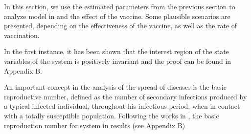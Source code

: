 \label{Sec:Rv_Analysis}
    In this section, we use the estimated parameters from the
previous section to analyze model in  and the effect of the
vaccine. Some plausible scenarios are presented, depending on the effectiveness
of the vaccine, as well as the rate of vaccination.

    In the first instance, it has been shown that the interest region
of the state variables of the system is positively invariant and the proof can
be found in Appendix B.

    An important concept in the analysis of the spread of diseases is
the basic reproductive number, defined as the number of secondary
infections produced by a typical infected individual, throughout his
infectious period, when in contact with a totally susceptible population.
Following the works in \cite{Diekmann1990, Van2002}, the basic reproduction
number for system in  results (see Appendix B)

